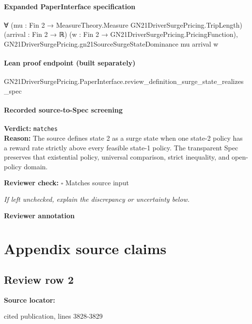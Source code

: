 \documentclass[10pt]{article}
\newcommand{\reviewerbox}{%
  \par\noindent\fbox{\parbox{0.96\linewidth}{\rule{0pt}{0.38in}}}\par
}
\newcommand{\reviewmatch}[1]{%
  \par\noindent\textbf{Reviewer check:} $\square$\; #1\par
  \noindent\emph{If left unchecked, explain the discrepancy or uncertainty below.}\par
}
\begin{document}
\paragraph{Expanded PaperInterface specification}
\begin{ReviewVerbatim}
∀ (mu : Fin 2 → MeasureTheory.Measure GN21DriverSurgePricing.TripLength) (arrival : Fin 2 → ℝ)
  (w : Fin 2 → GN21DriverSurgePricing.PricingFunction),
  GN21DriverSurgePricing.gn21SourceSurgeStateDominance mu arrival w
\end{ReviewVerbatim}

\paragraph{Lean proof endpoint (built separately)}\begin{ReviewVerbatim}
GN21DriverSurgePricing.PaperInterface.review_definition_surge_state_realizes_spec
\end{ReviewVerbatim}

\paragraph{Recorded source-to-Spec screening}
\textbf{Verdict:} \texttt{matches}
\\
\textbf{Reason:} The source defines state 2 as a surge state when one state-2 policy has a reward rate strictly above every feasible state-1 policy. The transparent Spec preserves that existential policy, universal comparison, strict inequality, and open-policy domain.
\reviewmatch{Matches source input}
\noindent\textbf{Reviewer annotation}\par
\reviewerbox
\clearpage
\hypertarget{source-claim-7650473d990d95c0}{}
\hypertarget{source-section-fc0f8ef37eccf87b}{}
\section*{Appendix source claims}
\subsection*{Review row 2}
\textbf{Source locator:} {\footnotesize\raggedright cited publication, lines 3828-\allowbreak{}3829\par}
\end{document}
